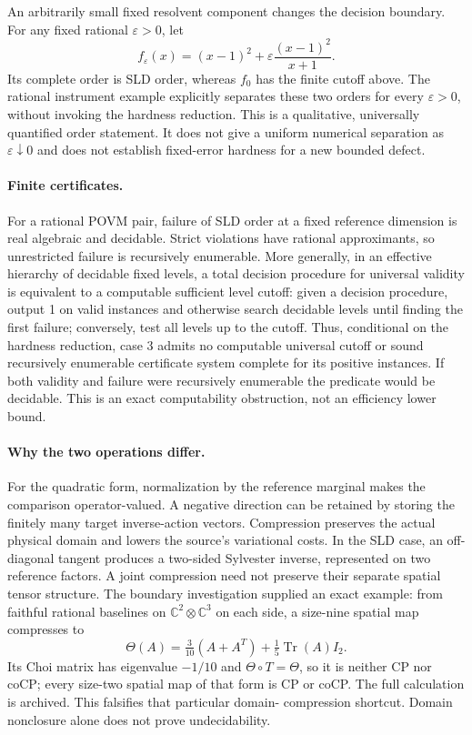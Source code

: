 \documentclass[11pt]{article}
\newcommand{\Tr}{\operatorname{Tr}}
\begin{document}
An arbitrarily small fixed resolvent component changes the decision boundary.
For any fixed rational $\varepsilon>0$, let
\[
 f_\varepsilon(x)=(x-1)^2+\varepsilon\frac{(x-1)^2}{x+1}.
\]
Its complete order is SLD order, whereas $f_0$ has the finite cutoff above.
The rational instrument example explicitly separates these two orders for
every $\varepsilon>0$, without invoking the hardness reduction.
This is a qualitative, universally quantified order statement. It does not
give a uniform numerical separation as $\varepsilon\downarrow0$ and does not
establish fixed-error hardness for a new bounded defect.

\paragraph{Finite certificates.}
For a rational POVM pair, failure of SLD order at a fixed reference dimension
is real algebraic and decidable. Strict violations have rational approximants,
so unrestricted failure is recursively enumerable. More generally, in an
effective hierarchy of decidable fixed levels, a total decision procedure for
universal validity is equivalent to a computable sufficient level cutoff:
given a decision procedure, output 1 on valid instances and otherwise search
decidable levels until finding the first failure; conversely, test all levels
up to the cutoff. Thus, conditional on the hardness reduction, case 3 admits
no computable universal cutoff or sound recursively enumerable certificate
system complete for its positive instances. If both validity and failure were
recursively enumerable the predicate would be decidable. This is an exact
computability obstruction, not an efficiency lower bound.

\paragraph{Why the two operations differ.}
For the quadratic form, normalization by the reference marginal makes the
comparison operator-valued. A negative direction can be retained by storing
the finitely many target inverse-action vectors. Compression preserves the
actual physical domain and lowers the source's variational costs. In the SLD
case, an off-diagonal tangent produces a two-sided Sylvester inverse, represented
on two reference factors. A joint compression need not preserve their separate
spatial tensor structure. The boundary investigation supplied an exact example:
from faithful rational baselines on $\mathbb C^2\otimes\mathbb C^3$ on each
side, a size-nine spatial map compresses to
\[
 \Theta(A)=\tfrac3{10}(A+A^T)+\tfrac15\Tr(A)I_2.
\]
Its Choi matrix has eigenvalue $-1/10$ and $\Theta\circ T=\Theta$, so it is
neither CP nor coCP; every size-two spatial map of that form is CP or coCP.
The full calculation is archived. This falsifies that particular domain-
compression shortcut. Domain nonclosure alone does not prove undecidability.
\end{document}
